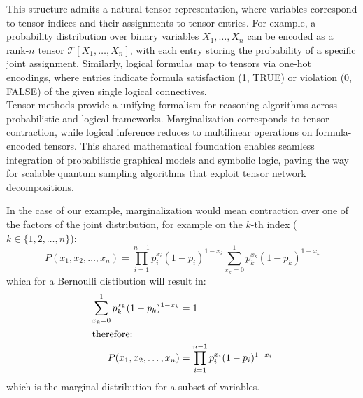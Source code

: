 \documentclass[encoding=utf8,british]{tumphthesis}
\begin{document}
        This structure admits a natural tensor representation, where variables correspond to tensor indices and their assignments to tensor 
        entries. For example, a probability distribution over binary variables $X_1, \ldots, X_n$ can be encoded as a rank-$n$ tensor 
        $\mathcal{T}[X_1, \ldots, X_n]$, with each entry storing the probability of a specific joint assignment. Similarly, logical formulas map to 
        tensors via one-hot encodings, where entries indicate formula satisfaction (1, TRUE) or violation (0, FALSE) of the given single logical connectives.
        \\
        Tensor methods provide a unifying formalism for reasoning algorithms across probabilistic and logical frameworks. Marginalization corresponds to tensor contraction, 
        while logical inference reduces to multilinear operations on formula-encoded tensors. This shared mathematical foundation enables seamless integration of probabilistic 
        graphical models and symbolic logic, paving the way for scalable quantum sampling algorithms that exploit tensor network decompositions.
        \begin{tcolorbox}[breakable, width=\linewidth, sharp corners=all, colback=white!95!black]
        In the case of our example, marginalization would mean contraction over one of the factors of the joint distribution, for example on the $k$-th index ($k \in \{1, 2, \dots, n\}$):
        \begin{equation*}
            P(x_1, x_2, \dots , x_n) = \prod_{i = 1}^{n-1} p_i^{x_i}(1-p_i)^{1-x_i} \sum_{x_k = 0}^1 p_k^{x_k}(1-p_k)^{1-x_k}
        \end{equation*}
        which for a Bernoulli distibution will result in:
        \begin{align*}
            \sum_{x_k = 0}^1 p_k^{x_k}(1-p_k)^{1-x_k} &= 1\\
            \intertext{therefore:}
            P(x_1, x_2, \dots , x_n) &= \prod_{i = 1}^{n-1} p_i^{x_i}(1-p_i)^{1-x_i}
        \end{align*}
        which is the marginal distribution for a subset of variables.
        
        \end{tcolorbox} 
\end{document}
